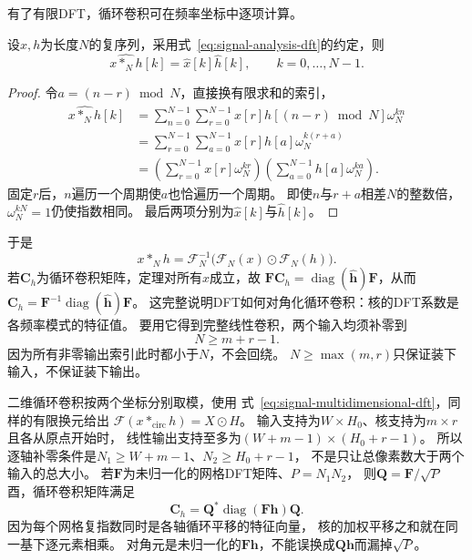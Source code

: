 有了有限DFT，循环卷积可在频率坐标中逐项计算。
\begin{theorem}[离散循环卷积定理]
  \label{thm:signal-analysis-circular-convolution-theorem}
  设$x,h$为长度$N$的复序列，采用式~\eqref{eq:signal-analysis-dft}的约定，则
  \[
    \widehat{x*_Nh}[k]=\widehat x[k]\widehat h[k],\qquad k=0,\ldots,N-1.
  \]
\end{theorem}
\begin{proof}
  令$a=(n-r)\bmod N$，直接换有限求和的索引，
  \begin{align*}
    \widehat{x*_Nh}[k]
    &=\sum_{n=0}^{N-1}\sum_{r=0}^{N-1}
      x[r]h[(n-r)\bmod N]\omega_N^{kn}\\
    &=\sum_{r=0}^{N-1}\sum_{a=0}^{N-1}
      x[r]h[a]\omega_N^{k(r+a)}\\
    &=\left(\sum_{r=0}^{N-1}x[r]\omega_N^{kr}\right)
      \left(\sum_{a=0}^{N-1}h[a]\omega_N^{ka}\right).
  \end{align*}
  固定$r$后，$n$遍历一个周期使$a$也恰遍历一个周期。
  即使$n$与$r+a$相差$N$的整数倍，$\omega_N^{kN}=1$仍使指数相同。
  最后两项分别为$\widehat x[k]$与$\widehat h[k]$。
\end{proof}
于是
\begin{equation}
  x*_Nh=\mathcal F_N^{-1}\bigl(\mathcal F_N(x)\odot\mathcal F_N(h)\bigr).
  \label{eq:signal-analysis-frequency-domain-convolution}
\end{equation}
\BookEquationAliases{\label{eq:cnn-fft-convolution}
\label{eq:cnn-convolution-theorem-derivation}}
若$\bm C_h$为循环卷积矩阵，定理对所有$x$成立，故
$\bm F\bm C_h=\operatorname{diag}(\widehat{\bm h})\bm F$，从而
$\bm C_h=\bm F^{-1}\operatorname{diag}(\widehat{\bm h})\bm F$。
这完整说明DFT如何对角化循环卷积：核的DFT系数是各频率模式的特征值。
要用它得到完整线性卷积，两个输入均须补零到
\begin{equation}
  N\geq m+r-1.
  \label{eq:signal-analysis-linear-padding-condition}
\end{equation}
因为所有非零输出索引此时都小于$N$，不会回绕。
$N\geq\max(m,r)$只保证装下输入，不保证装下输出。

二维循环卷积按两个坐标分别取模，使用
式~\eqref{eq:signal-multidimensional-dft}，同样的有限换元给出
$\mathcal F(x*_{\mathrm{circ}}h)=X\odot H$。
输入支持为$W\times H_0$、核支持为$m\times r$且各从原点开始时，
线性输出支持至多为$(W+m-1)\times(H_0+r-1)$。
所以逐轴补零条件是$N_1\geq W+m-1$、$N_2\geq H_0+r-1$，
不是只让总像素数大于两个输入的总大小。
若$\bm F$为未归一化的网格DFT矩阵、$P=N_1N_2$，
则$\bm Q=\bm F/\sqrt P$酉，循环卷积矩阵满足
\begin{equation}
 \bm C_h=\bm Q^*\operatorname{diag}(\bm F\bm h)\bm Q.
 \label{eq:signal-multidimensional-circulant}
\end{equation}
因为每个网格复指数同时是各轴循环平移的特征向量，
核的加权平移之和就在同一基下逐元素相乘。
对角元是未归一化的$\bm F\bm h$，不能误换成$\bm Q\bm h$而漏掉$\sqrt P$。

